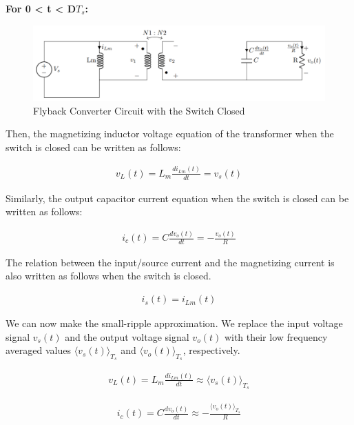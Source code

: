\textbf{For 0 < t < D$T_s$:}

\begin{figure}[H]
\begin{center}
\includegraphics[width=1\textwidth]{Compensator/flyback_on.png}
\caption{Flyback Converter Circuit with the Switch Closed}
\label{com:fly_on}
\end{center}
\end{figure}

Then, the magnetizing inductor voltage equation of the transformer when the switch is closed can be written as follows:

\begin{align}
    v_L(t) = L_m\frac{di_{Lm}(t)}{dt} = v_s(t)
\end{align}

Similarly, the output capacitor current equation when the switch is closed can be written as follows:

\begin{align}
    i_c(t) = C\frac{dv_o(t)}{dt} = -\frac{v_o(t)}{R}
\end{align}

The relation between the input/source current and the magnetizing current is also written as follows when the switch is closed.

\begin{align}
    i_s(t) = i_{Lm}(t)
\end{align}

We can now make the small-ripple approximation. We replace the input voltage signal $v_s(t)$ and the output voltage signal $v_o(t)$ with their low frequency averaged values $\langle v_s(t) \rangle_{T_s}$ and $\langle v_o(t) \rangle_{T_s}$, respectively.

\begin{align}
    v_L(t) = L_m\frac{di_{Lm}(t)}{dt} \approx \langle v_s(t) \rangle_{T_s}
\end{align}

\begin{align}
    i_c(t) = C\frac{dv_o(t)}{dt} \approx -\frac{\langle v_o(t) \rangle_{T_s}}{R}
\end{align}

